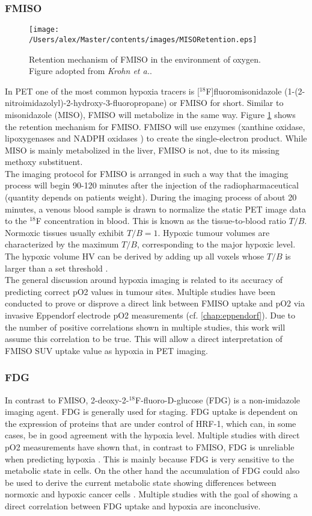 \subsubsection{FMISO}
\begin{figure}[hb]
\centering
\texttt{[image: /Users/alex/Master/contents/images/MISORetention.eps]}
\vspace{1cm}
\caption{Retention mechanism of FMISO in the environment of oxygen. Figure adopted from \textit{Krohn et a.}\cite{pmid18523070}.}
\label{fig:MISORetention}
\end{figure}
In PET one of the most common hypoxia tracers is [$^{18}$F]fluoromisonidazole (1-(2-nitroimidazolyl)-2-hydroxy-3-fluoropropane) or FMISO for short. Similar to misonidazole (MISO), FMISO will metabolize in the same way. Figure \ref{fig:MISORetention} shows the retention mechanism for FMISO. FMISO will use enzymes (xanthine oxidase, lipoxygenases and NADPH oxidases \cite{pmid18523070}) to create the single-electron product. While MISO is mainly metabolized in the liver, FMISO is not, due to its missing methoxy substituent.\\The imaging protocol for FMISO is arranged in such a way that the imaging process will begin 90-120 minutes after the injection of the radiopharmaceutical (quantity depends on patients weight). During the imaging process of about 20 minutes, a venous blood sample is drawn to normalize the static PET image data to the $^{18}$F concentration in blood. This is known as the tissue-to-blood ratio $T/B$. Normoxic tissues usually exhibit $T/B = 1$. Hypoxic tumour volumes are characterized by the maximum $T/B$, corresponding to the major hypoxic level. The hypoxic volume HV can be derived by adding up all voxels whose $T/B$ is larger than a set threshold \cite{pmid18523070}.\\The general discussion around hypoxia imaging is related to its accuracy of predicting correct pO2 values in tumour sites. Multiple studies have been conducted to prove or disprove a direct link between FMISO uptake and pO2 via invasive Eppendorf electrode pO2 measurements (cf. \ref{chap:eppendorf}). Due to the number of positive correlations shown in multiple studies, this work will assume this correlation to be true. This will allow a direct interpretation of FMISO SUV uptake value as hypoxia in PET imaging.
\subsubsection{FDG}
In contrast to FMISO, 2-deoxy-2-$^{18}$F-fluoro-D-glucose (FDG) is a non-imidazole imaging agent. FDG is generally used for staging. FDG uptake is dependent on the expression of proteins that are under control of HRF-1, which can, in some cases, be in good agreement with the hypoxia level. Multiple studies with direct pO2 measurements have shown that, in contrast to FMISO, FDG is unreliable when predicting hypoxia \cite{pmid18682937}. This is mainly because FDG is very sensitive to the metabolic state in cells. On the other hand the accumulation of FDG could also be used to derive the current metabolic state showing differences between normoxic and hypoxic cancer cells \cite{pmid17400370}. Multiple studies with the goal of showing a direct correlation between FDG uptake and hypoxia are inconclusive.
